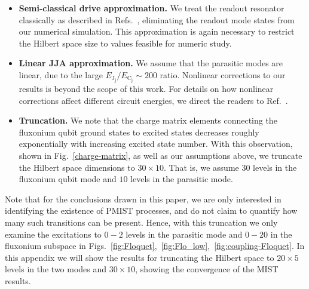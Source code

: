 \documentclass[%
reprint,
superscriptaddress,
 amsmath,amssymb,
 aps,
 prx,
longbibliography,
floatfix,
]{revtex4-2}
\begin{document}
{\begin{itemize}
    \item \textbf{Semi-classical drive approximation.}  We treat the readout resonator classically as described in Refs.~\cite{xiao2023diagrammatic,dumas2024unified,cohen2023reminiscence,khezri2023measurement}, eliminating the readout mode states from our numerical simulation. This approximation is again necessary to restrict the Hilbert space size to values feasible for numeric study.
    
    \item \textbf{Linear JJA approximation.} We assume that the parasitic modes are linear, due to the large $E_{\textrm{J}_\textrm{j}}/E_{\textrm{C}_\textrm{j}} \sim 200$ ratio. Nonlinear corrections to our results is beyond the scope of this work. For details on how nonlinear corrections affect different circuit energies, we direct the readers to Ref.~\cite{viola2015collective}. 
    \item \textbf{Truncation.} We note that the charge matrix elements connecting the fluxonium qubit ground states to excited states decreases roughly exponentially with increasing excited state number. With this observation, shown in Fig.~\ref{charge-matrix}, as well as our assumptions above, we truncate the Hilbert space dimensions to $30\times 10$. That is, we assume $30$ levels in the fluxonium qubit mode and $10$ levels in the parasitic mode. 
    \end{itemize}
    Note that for the conclusions drawn in this paper, we are only interested in identifying the existence of PMIST processes, and do not claim to quantify how many such transitions can be present. Hence, with this truncation we only examine the excitations to $0-2$ levels in the parasitic mode and $0-20$ in the fluxonium subspace in Figs.~\ref{fig:Floquet},~\ref{fig:Flo_low},~\ref{fig:coupling-Floquet}. In this appendix we will show the results for truncating the Hilbert space to $20
    \times 5$ levels in the two modes and $30
    \times 10$, showing the convergence of the MIST results.

}
\end{document}
